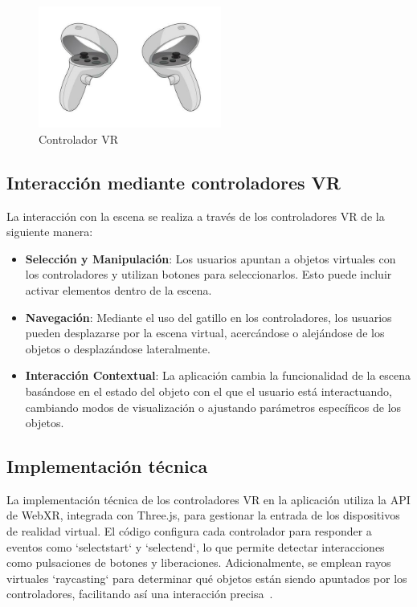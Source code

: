 \documentclass[a4paper, 12pt]{book}
\begin{document}
\begin{figure}
  \centering
  \includegraphics[width=6cm, keepaspectratio]{img/controlador.png}
  \caption{Controlador VR}
  \label{fig:controlador}
\end{figure}


\subsection{Interacción mediante controladores VR}
\label{subsec:interaccion_controladores_vr}

La interacción con la escena se realiza a través de los controladores VR de la siguiente manera:

\begin{itemize}
  \item \textbf{Selección y Manipulación}: Los usuarios apuntan a objetos virtuales con los controladores y utilizan 
  botones para seleccionarlos. Esto puede incluir activar elementos dentro de la escena.
  \item \textbf{Navegación}: Mediante el uso del gatillo en los controladores, 
  los usuarios pueden desplazarse por la escena virtual, acercándose o alejándose de los objetos o desplazándose lateralmente.
  \item \textbf{Interacción Contextual}: La aplicación cambia la funcionalidad de la escena 
  basándose en el estado del objeto con el que el usuario está interactuando, 
  cambiando modos de visualización o ajustando parámetros específicos de los objetos.
\end{itemize}

\subsection{Implementación técnica}
\label{subsec:implementacion_tecnica_vr}

La implementación técnica de los controladores VR en la aplicación utiliza la API de WebXR, integrada con Three.js, para gestionar la entrada 
de los dispositivos de realidad virtual. El código configura cada controlador para responder a eventos como `selectstart` y `selectend`, 
lo que permite detectar interacciones como pulsaciones de botones y liberaciones. Adicionalmente, se emplean rayos virtuales `raycasting` 
para determinar qué objetos están siendo apuntados por los controladores, facilitando así una interacción precisa~\cite{Using_a_WebXR_controller_using_Three.JS}.
\end{document}
